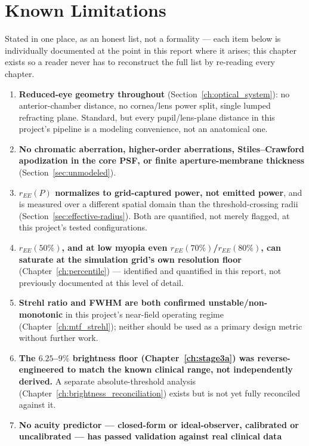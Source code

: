 \chapter{Known Limitations}
\label{ch:limitations}

Stated in one place, as an honest list, not a formality --- each item below is
individually documented at the point in this report where it arises; this chapter
exists so a reader never has to reconstruct the full list by re-reading every chapter.

\begin{enumerate}
\item \textbf{Reduced-eye geometry throughout} (Section~\ref{ch:optical_system}): no
  anterior-chamber distance, no cornea/lens power split, single lumped refracting
  plane. Standard, but every pupil/lens-plane distance in this project's pipeline is a
  modeling convenience, not an anatomical one.
\item \textbf{No chromatic aberration, higher-order aberrations, Stiles--Crawford
  apodization in the core PSF, or finite aperture-membrane thickness}
  (Section~\ref{sec:unmodeled}).
\item \textbf{$r_{EE}(P)$ normalizes to grid-captured power, not emitted power}, and is
  measured over a different spatial domain than the threshold-crossing radii
  (Section~\ref{sec:effective-radius}). Both are quantified, not merely flagged, at
  this project's tested configurations.
\item \textbf{$r_{EE}(50\%)$, and at low myopia even $r_{EE}(70\%)$/$r_{EE}(80\%)$, can
  saturate at the simulation grid's own resolution floor}
  (Chapter~\ref{ch:percentile}) --- identified and quantified in this report, not
  previously documented at this level of detail.
\item \textbf{Strehl ratio and FWHM are both confirmed unstable/non-monotonic} in this
  project's near-field operating regime (Chapter~\ref{ch:mtf_strehl}); neither should
  be used as a primary design metric without further work.
\item \textbf{The $6.25$--$9\%$ brightness floor (Chapter~\ref{ch:stage3a}) was
  reverse-engineered to match the known clinical range, not independently derived.}
  A separate absolute-threshold analysis (Chapter~\ref{ch:brightness_reconciliation})
  exists but is not yet fully reconciled against it.
\item \textbf{No acuity predictor --- closed-form or ideal-observer, calibrated or
  uncalibrated --- has passed validation against real clinical data}

\end{enumerate}
